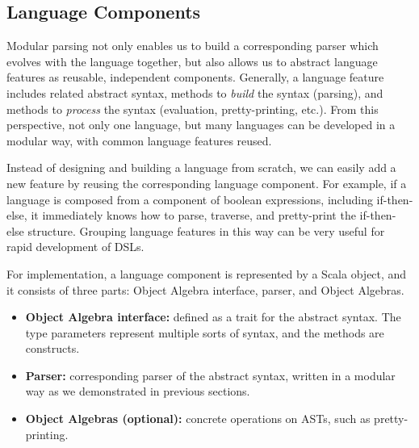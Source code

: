 \begin{comment}
It is natural to keep overriding existing parsers, whereas another potential use of this pattern is to reuse old versions of a parser. For instance,
we have a \lstinline{NewParser} that extends \lstinline{ExtParser}, with some more cases added, but for the lambda case we want to go back to the untyped one.
It can be achieved by instantiating an instance of \lstinline{BaseParser} to obtain the old \lstinline{pLam}. However, we must have \inlinecode{lazy} modifier for all the \inlinecode{pLam} starting from \inlinecode{BaseParser}.

\end{comment}

\subsection{Language Components}\label{subsec:language-component}

Modular parsing not only enables us to build a corresponding parser
which evolves with the language together, but also allows us to
abstract language features as reusable, independent components.
Generally, a language feature includes related abstract syntax,
methods to \textit{build} the syntax (parsing), and methods to
\textit{process} the syntax (evaluation, pretty-printing, etc.). From
this perspective, not only one language, but many languages can be
developed in a modular way, with common language features reused.

Instead of designing and building a language from scratch, we can
easily add a new feature by reusing the corresponding language
component. For example, if a language is composed from a component of
boolean expressions, including if-then-else, it immediately knows how
to parse, traverse, and pretty-print the if-then-else structure.
Grouping language features in this way can
be very useful for rapid development of DSLs.

For implementation, a language component is represented by a Scala object, and it consists of three parts: Object Algebra interface, parser, and Object Algebras.

\begin{itemize}
    \item \textbf{Object Algebra interface:} defined as a trait for the abstract syntax. The type parameters represent multiple sorts of syntax, and the methods are constructs.
    \item \textbf{Parser:} corresponding parser of the abstract syntax, written in a modular way as we demonstrated in previous sections.
    \item \textbf{Object Algebras (optional):} concrete operations on ASTs, such as pretty-printing.
\end{itemize}

